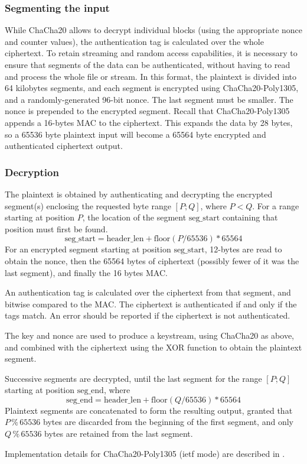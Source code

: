 \subsubsection{Segmenting the input}
%
While ChaCha20 allows to decrypt individual blocks (using the
appropriate nonce and counter values), the authentication tag is
calculated over the whole ciphertext.
%
To retain streaming and random access capabilities, it is necessary to
ensure that segments of the data can be authenticated, without having
to read and process the whole file or stream.
%
In this format, the plaintext is divided into 64 kilobytes segments,
and each segment is encrypted using ChaCha20-Poly1305, and a
randomly-generated 96-bit nonce. The last segment must be smaller.
%
The nonce is prepended to the encrypted segment. Recall that
ChaCha20-Poly1305 appends a 16-bytes MAC to the ciphertext.
%
This expands the data by 28 bytes, so a 65536 byte plaintext input
will become a 65564 byte encrypted and authenticated ciphertext
output.

\subsubsection{Decryption}
The plaintext is obtained by authenticating and decrypting the
encrypted segment(s) enclosing the requested byte range $[P;Q]$, where
$P<Q$.
%
For a range starting at position $P$, the location of the segment
$\text{seg\_start}$ containing that position must first be found.
%
$$\text{seg\_start} = \text{header\_len} + \text{floor}(P/65536) *
65564$$
%
For an encrypted segment starting at position $\text{seg\_start}$,
12-bytes are read to obtain the nonce, then the 65564 bytes of
ciphertext (possibly fewer of it was the last segment), and finally
the 16 bytes MAC.

An authentication tag is calculated over the ciphertext from that
segment, and bitwise compared to the MAC. The ciphertext is
authenticated if and only if the tags match.
%
An error should be reported if the ciphertext is not authenticated.

The key and nonce are used to produce a keystream, using ChaCha20 as
above, and combined with the ciphertext using the XOR function to
obtain the plaintext segment.

Successive segments are decrypted, until the last segment for the
range $[P;Q]$ starting at position $\text{seg\_end}$, where
$$\text{seg\_end} = \text{header\_len} + \text{floor}(Q/65536) *
65564$$
%
Plaintext segments are concatenated to form the resulting output,
granted that $P \mathbin{\%} 65536$ bytes are discarded from the
beginning of the first segment, and only $Q \mathbin{\%} 65536$ bytes
are retained from the last segment.

Implementation details for ChaCha20-Poly1305 (ietf mode) are described
in \cite{RFC8439}.

